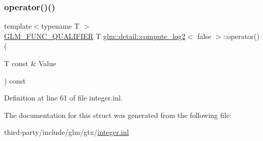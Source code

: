 \subsubsection{\texorpdfstring{operator()()}{operator()()}}
{\footnotesize\ttfamily template$<$typename T $>$ \\
\hyperlink{setup_8hpp_a33fdea6f91c5f834105f7415e2a64407}{G\+L\+M\+\_\+\+F\+U\+N\+C\+\_\+\+Q\+U\+A\+L\+I\+F\+I\+ER} T \hyperlink{structglm_1_1detail_1_1compute__log2}{glm\+::detail\+::compute\+\_\+log2}$<$ false $>$\+::operator() (\begin{DoxyParamCaption}\item[{T const \&}]{Value }\end{DoxyParamCaption}) const\hspace{0.3cm}{\ttfamily [inline]}}



Definition at line 61 of file integer.\+inl.



The documentation for this struct was generated from the following file\+:\begin{DoxyCompactItemize}
\item 
third-\/party/include/glm/gtx/\hyperlink{integer_8inl}{integer.\+inl}\end{DoxyCompactItemize}
